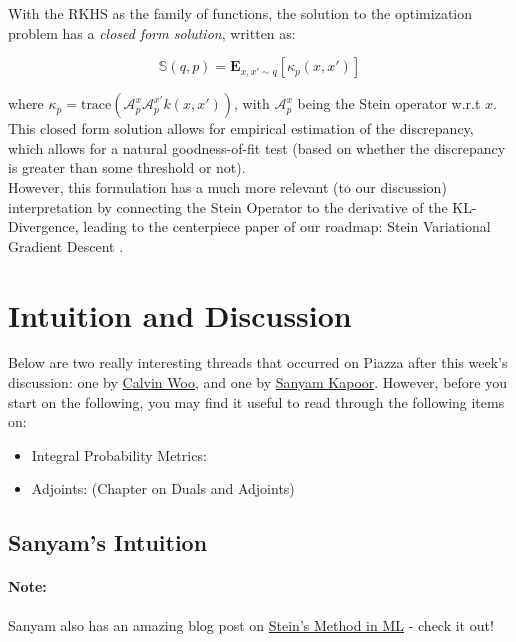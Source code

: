 \documentclass[12pt]{article}
\begin{document}
\noindent With the RKHS as the family of functions, the solution to the optimization problem has a \textit{closed form solution}, written as:

\begin{equation}
    \mathbb{S}(q, p) = \mathbf{E}_{x, x' \sim q}[\kappa_p(x, x')]
\end{equation}

\noindent where $\kappa_p = \text{trace}(\mathcal{A}_p^x\mathcal{A}_p^{x'}k(x, x'))$, with $\mathcal{A}_p^x$ being the Stein operator w.r.t $x$. This closed form solution allows for empirical estimation of the discrepancy, which allows for a natural goodness-of-fit test (based on whether the discrepancy is greater than some threshold or not). \\

\noindent However, this formulation has a much more relevant (to our discussion) interpretation by connecting the Stein Operator to the derivative of the KL-Divergence, leading to the centerpiece paper of our roadmap: Stein Variational Gradient Descent \cite{liu2016stein}.

\section{Intuition and Discussion}

Below are two really interesting threads that occurred on Piazza after this week's discussion: one by \href{}{Calvin Woo}, and one by \href{}{Sanyam Kapoor}. However, before you start on the following, you may find it useful to read through the following items on:

\begin{itemize}
    \item Integral Probability Metrics: \cite{gorham2015measuring, imp1, imp2}
    \item Adjoints: \cite{inflarge} (Chapter on Duals and Adjoints)
\end{itemize}

\subsection{Sanyam's Intuition}

\paragraph{Note:} Sanyam also has an amazing blog post on \href{https://www.sanyamkapoor.com/machine-learning/stein-gradient/}{Stein's Method in ML} - check it out!
\end{document}

